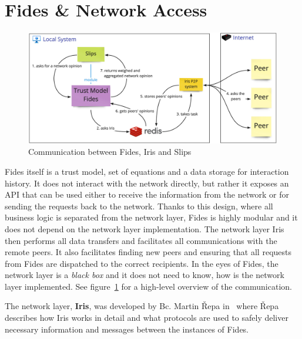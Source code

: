 \section{Fides \& Network Access}
\label{sec:fides-and-network-access}

\begin{figure}[ht]
    \centering
    \includegraphics[width=1.0\textwidth]{assets/communication_architecture.jpeg}
    \caption{Communication between Fides, Iris and Slips}
    \label{fig:fides-api-network}
\end{figure}

Fides itself is a trust model, set of equations and a data storage for interaction history. 
It does not interact with the network directly, but rather it exposes an API that can be used either to receive the information from the network or for sending the requests back to the network.
Thanks to this design, where all business logic is separated from the network layer, Fides is highly modular and it does not depend on the network layer implementation.
The network layer Iris then performs all data transfers and facilitates all communications with the remote peers.
It also facilitates finding new peers and ensuring that all requests from Fides are dispatched to the correct recipients.
In the eyes of Fides, the network layer is a \textit{black box} and it does not need to know, how is the network layer implemented.
See figure~\ref{fig:fides-api-network} for a high-level overview of the communication.

The network layer, \textbf{Iris}, was developed by Bc. Martin Řepa in~\cite{nl} where Řepa describes how Iris works in detail and what protocols are used to safely deliver necessary information and messages between the instances of Fides.